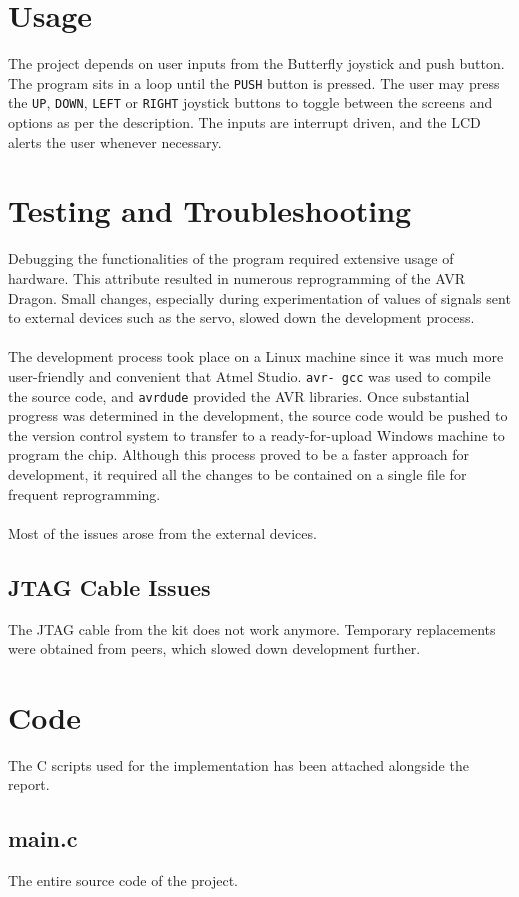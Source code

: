 \documentclass[usletter, 12pt]{article}
\begin{document}
    \section{Usage} The project depends on user inputs from the Butterfly
    joystick and push button. The program sits in a loop until the
    \texttt{PUSH} button is pressed. The user may press the \texttt{UP},
    \texttt{DOWN}, \texttt{LEFT} or \texttt{RIGHT} joystick buttons to toggle
    between the screens and options as per the description. The inputs are
    interrupt driven, and the LCD alerts the user whenever necessary.

    \section{Testing and Troubleshooting} Debugging the functionalities of the
    program required extensive usage of hardware. This attribute resulted in
    numerous reprogramming of the AVR Dragon. Small changes, especially during
    experimentation of values of signals sent to external devices such as the
    servo, slowed down the development process. \\~\\
    \noindent The development process took place on a Linux machine since it
    was much more user-friendly and convenient that Atmel Studio. \texttt{avr-
    gcc} was used to compile the source code, and \texttt{avrdude} provided the
    AVR libraries. Once substantial progress was determined in the development,
    the source code would be pushed to the version control system to transfer
    to a ready-for-upload Windows machine to program the chip. Although this
    process proved to be a faster approach for development, it required all the
    changes to be contained on a single file for frequent reprogramming. \\~\\
    \noindent Most of the issues arose from the external devices.

        \subsection{JTAG Cable Issues} The JTAG cable from the kit does not
        work anymore. Temporary replacements were obtained from peers, which
        slowed down development further.

    \section{Code} The C scripts used for the implementation has been attached
    alongside the report.

        \subsection{main.c} The entire source code of the project.
\end{document}
